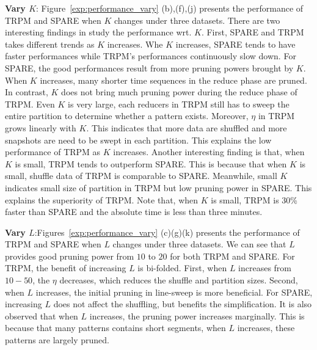 \textbf{Vary $K$}: Figure~\ref{exp:performance_vary} (b),(f),(j) 
presents the performance of TRPM and SPARE when $K$ changes under three datasets. 
There are two interesting findings in study the performance wrt. $K$. 
First, SPARE and TRPM takes different trends as $K$ increases. 
Whe $K$ increases, SPARE tends to have faster performances 
while TRPM's performances continuously slow down. For SPARE, the 
good performances result from more pruning powers brought
by $K$. When $K$ increases, many shorter time sequences in the reduce phase
are pruned. In contrast, $K$ does not bring much pruning power
during the reduce phase of TRPM. Even $K$ is very large, each reducers in TRPM
still has to sweep the entire partition to determine whether a pattern exists.
Moreover, $\eta$ in TRPM grows linearly with $K$. This indicates that
more data are shuffled and more snapshots are need to
be swept in each partition. This explains the low performance of TRPM as $K$
increases. Another interesting finding is that, when $K$ is small,
TRPM tends to outperform SPARE. This is because that when $K$ is small, shuffle
data of TRPM is comparable to SPARE. Meanwhile, small $K$ indicates small
size of partition in TRPM but low pruning power in SPARE. This explains the
superiority of TRPM. Note that, when $K$ is small, TRPM is 30\% 
faster than SPARE and the absolute time is less than three minutes. 

\textbf{Vary $L$}:Figures~\ref{exp:performance_vary} (c)(g)(k) presents the performance
of TRPM and SPARE when $L$ changes under three datasets. We can see that $L$
provides good pruning power from $10$ to $20$ for both TRPM and SPARE. For TRPM,
the benefit of increasing $L$ is bi-folded. First, when $L$ increases from $10-50$, 
the $\eta$ decreases, which reduces the shuffle and partition sizes. Second, when
$L$ increases, the initial pruning in line-sweep is more beneficial. For SPARE,
increasing $L$ does not affect the shuffling, but benefits the simplification.
It is also observed that when $L$ increases, the pruning power increases marginally.
This is because that many patterns contains short segments, when $L$ increases,
these patterns are largely pruned.

